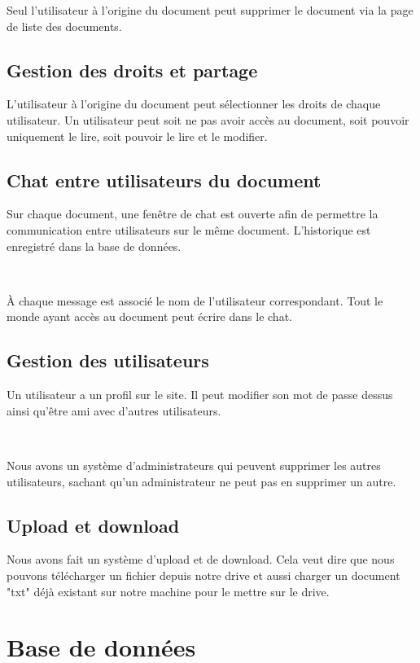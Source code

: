 \documentclass[a4paper, 12pt]{article}
\begin{document}
	Seul l'utilisateur à l'origine du document peut supprimer le document via la page de liste des documents.
	
	\subsection{Gestion des droits et partage}
	
	L'utilisateur à l'origine du document peut sélectionner les droits de chaque utilisateur. Un utilisateur peut soit ne pas avoir accès au document, soit pouvoir uniquement le lire, soit pouvoir le lire et le modifier.
	
	\subsection{Chat entre utilisateurs du document}
	
	Sur chaque document, une fenêtre de chat est ouverte afin de permettre la communication entre utilisateurs sur le même document. L'historique est enregistré dans la base de données.
	
	~
	
	À chaque message est associé le nom de l'utilisateur correspondant. Tout le monde ayant accès au document peut écrire dans le chat.
	
	\subsection{Gestion des utilisateurs}
	
	Un utilisateur a un profil sur le site. Il peut modifier son mot de passe dessus ainsi qu'être ami avec d'autres utilisateurs.
	
	~
	
	Nous avons un système d'administrateurs qui peuvent supprimer les autres utilisateurs, sachant qu'un administrateur ne peut pas en supprimer un autre.
	
	\subsection{Upload et download}
	
	Nous avons fait un système d'upload et de download. Cela veut dire que nous pouvons télécharger un fichier depuis notre drive et aussi charger un document "txt" déjà existant sur notre machine pour le mettre sur le drive.
	
	\section{Base de données}
	
\end{document}
